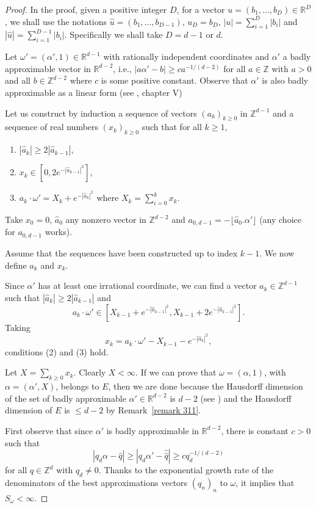 \documentclass[12pt,reqno,a4paper]{amsart}%
\numberwithin{equation}{section}
\newcommand{\Rr}{{\mathbb{R}}}
\newcommand{\Zz}{{\mathbb{Z}}}
\begin{document}
	\begin{proof}
		In the proof, given a positive integer $D$, for a vector 
		$u=(b_1,\dots,b_{D})\in\Rr^{D}$, 
		we shall use the  notations 
		$\hat u=(b_1,\dots,b_{D-1})$, $u_D=b_D$,
		$|u|=\sum_{i=1}^D|b_i|$ and $|\hat u|=\sum_{i=1}^{D-1}|b_i|$.
		Specifically we shall take $D=d-1$ or $d$.
		
		Let $\omega'=(\alpha',1)\in\Rr^{d-1}$ with rationally independent coordinates and $\alpha'$ a badly approximable vector in $\Rr^{d-2}$, i.e., $|a\alpha'-b|\geq ca^{-1/(d-2)}$ for all $a\in \Zz$ with $a>0$ and all $b\in\Zz^{d-2}$ where $c$ is some positive constant. Observe that $\alpha'$ is also badly approximable as a linear form (see \cite{Cassels57}, chapter V)
		   
		Let  us construct by induction  a sequence of vectors $(a_k)_{k\geq 0}$ in $\Zz^{d-1}$ and a sequence of real numbers $(x_k)_{k\geq 0}$  such that for all $k\geq 1$,
		\begin{enumerate}
			\item $|\hat a_k|\geq 2|\hat a_{k-1}|$,
			\item $x_k\in[0,2e^{-|\hat a_{k-1}|^2}]$,
			\item $a_k\cdot\omega'=X_k+e^{-|\hat a_{k}|^2}$ where $X_k=\sum_{i=0}^k x_k$.
		\end{enumerate} 
		
		Take $x_0=0$, $\hat a_0$ any nonzero vector in $\Zz^{d-2}$ and  $a_{0,d-1}=-\lfloor \hat a_0.\alpha' \rfloor$ (any choice for $a_{0,d-1}$ works).		
		

Assume that the sequences have been constructed up to index $k-1$. We now define $a_k$ and $x_k$.
		
	
		Since  $\alpha'$ has at least one irrational coordinate, we can find a vector $ a_k\in\Zz^{d-1}$ such that $|\hat a_k|\geq 2|\hat a_{k-1}|$ and 
		\[
		a_k\cdot\omega'\in [X_{k-1}+e^{-|\hat a_{k-1}|^2},X_{k-1}+2e^{-|\hat a_{k-1}|^2}].
		\]
			Taking 
		\[
		x_k=a_k\cdot\omega'-X_{k-1}-e^{-|\hat a_{k}|^2},
		\]
		conditions (2) and (3) hold.
		
		Let $X=\sum_{k\geq 0}x_k$. Clearly $X<\infty$. If we can prove that  $\omega=(\alpha,1)$,  with $\alpha=(\alpha',X)$, belongs to $E$,  then we are done because the Hausdorff dimension of the set of badly approximable $\alpha'\in\Rr^{d-2}$ is $d-2$ (see \cite{Sch}) and the Hausdorff dimension of $E$ is $\leq d-2$ by Remark~\ref{remark 311}.
		
		First observe that since $\alpha'$ is badly approximable in $\Rr^{d-2}$, there is constant $c>0$ such that  
		\[
		|q_{d}\alpha-\hat q|\ge|q_d\alpha'-\hat{\hat q}|\geq c q_{d}^{-1/(d-2)}
		\] 
		for all $q\in\Zz^d$ with $q_d\neq 0$. Thanks to the exponential growth rate of the denominators of the best approximations vectors $(q_n)_n$ to $\omega$,  it implies that 
		$S_{\omega}<\infty$.
		

\end{proof}
\end{document}
